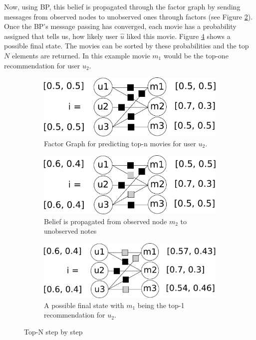 Now, using BP, this belief is propagated through the factor graph by sending messages from observed nodes to unobserved ones through factors (see Figure \ref{top_n_graph_important_msg}). Once the BP's message passing has converged, each movie has a probability assigned that tells us, how likely user $\hat u$ liked this movie. Figure \ref{top_n_graph_final_state} shows a possible final state. The movies can be sorted by these probabilities and the top $N$ elements are returned. In this example movie $m_1$ would be the top-one recommendation for user $u_2$.

\begin{figure}
	\centering
	\begin{subfigure}{.6\columnwidth}
	   \includegraphics[scale=0.3]{graphics/top-n-graph.pdf}%
	      \caption{Factor Graph for predicting top-n movies for user $u_2$.
	      \label{top_n_graph}
	   }
	\end{subfigure}\hfill%
	\begin{subfigure}{.6\columnwidth}
	   \includegraphics[scale=0.3]{graphics/top-n-important-messages.pdf}%
      	   \caption{Belief is propagated from observed node $m_2$ to unobserved notes 
	      \label{top_n_graph_important_msg}
	   }
	\end{subfigure}\hfill%
	\begin{subfigure}{.6\columnwidth}
	   \includegraphics[scale=0.3]{graphics/top-n-final.pdf}%
	      \caption{A possible final state with $m_1$ being the top-1 recommendation for $u_2$. 
	      \label{top_n_graph_final_state}
	   }
	\end{subfigure}
	\caption{Top-N step by step}
\end{figure}

